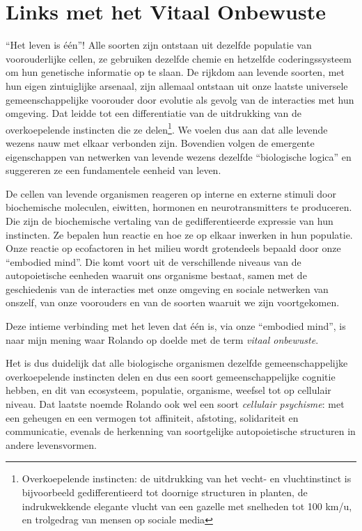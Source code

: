 \documentclass[
  11pt,
]{book}
\begin{document}
\hypertarget{links-met-het-vitaal-onbewuste}{%
\section{Links met het Vitaal Onbewuste}\label{links-met-het-vitaal-onbewuste}}

``Het leven is één''! Alle soorten zijn ontstaan uit dezelfde populatie van voorouderlijke cellen, ze gebruiken dezelfde chemie en hetzelfde coderingssysteem om hun genetische informatie op te slaan. De rijkdom aan levende soorten, met hun eigen zintuiglijke arsenaal, zijn allemaal ontstaan uit onze laatste universele gemeenschappelijke voorouder door evolutie als gevolg van de interacties met hun omgeving. Dat leidde tot een differentiatie van de uitdrukking van de overkoepelende instincten die ze delen\footnote{Overkoepelende instincten: de uitdrukking van het vecht- en vluchtinstinct is bijvoorbeeld gedifferentieerd tot doornige structuren in planten, de indrukwekkende elegante vlucht van een gazelle met snelheden tot 100 km/u, en trolgedrag van mensen op sociale media}. We voelen dus aan dat alle levende wezens nauw met elkaar verbonden zijn. Bovendien volgen de emergente eigenschappen van netwerken van levende wezens dezelfde ``biologische logica'' en suggereren ze een fundamentele eenheid van leven.

De cellen van levende organismen reageren op interne en externe stimuli door biochemische moleculen, eiwitten, hormonen en neurotransmitters te produceren. Die zijn de biochemische vertaling van de gedifferentieerde expressie van hun instincten. Ze bepalen hun reactie en hoe ze op elkaar inwerken in hun populatie. Onze reactie op ecofactoren in het milieu wordt grotendeels bepaald door onze ``embodied mind''. Die komt voort uit de verschillende niveaus van de autopoietische eenheden waaruit ons organisme bestaat, samen met de geschiedenis van de interacties met onze omgeving en sociale netwerken van onszelf, van onze voorouders en van de soorten waaruit we zijn voortgekomen.

Deze intieme verbinding met het leven dat één is, via onze ``embodied mind'', is naar mijn mening waar Rolando op doelde met de term \emph{vitaal onbewuste}.

Het is dus duidelijk dat alle biologische organismen dezelfde gemeenschappelijke overkoepelende instincten delen en dus een soort gemeenschappelijke cognitie hebben, en dit van ecosysteem, populatie, organisme, weefsel tot op cellulair niveau. Dat laatste noemde Rolando ook wel een soort \emph{cellulair psychisme}: met een geheugen en een vermogen tot affiniteit, afstoting, solidariteit en communicatie, evenals de herkenning van soortgelijke autopoietische structuren in andere levensvormen.
\end{document}
